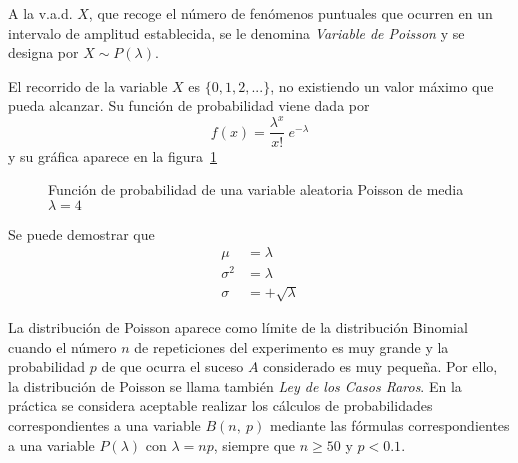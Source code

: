 A la v.a.d. $X$, que recoge el número de fenómenos puntuales que ocurren en un intervalo de amplitud establecida, se le
denomina \emph{Variable de Poisson} y se designa por $X\sim P(\lambda)$.

El recorrido de la variable $X$ es $\{0,1,2,...\}$, no existiendo un valor máximo que pueda alcanzar. Su función de
probabilidad viene dada por \[ f(x) = \frac{{\lambda ^x }}{{x!}}\  e^{ - \lambda } \] y su gráfica aparece en la
figura~\ref{g:poisson}

\begin{figure}[h!]
\centering
\scalebox{0.8}{} 
\caption{Función de probabilidad de una variable aleatoria Poisson de media $\lambda=4$}\label{g:poisson}
\end{figure}

Se puede demostrar que
\begin{align*}
\mu  &= \lambda\\
\sigma ^2  &= \lambda\\
\sigma  &=  + \sqrt {\lambda}
\end{align*}

La distribución de Poisson aparece como límite de la distribución Binomial cuando el número $n$ de repeticiones del
experimento es muy grande y la probabilidad $p$ de que ocurra el suceso $A$ considerado es muy pequeña.
Por ello, la distribución de Poisson se llama también \emph{Ley de los Casos Raros}.
En la práctica se considera aceptable realizar los cálculos de probabilidades correspondientes a una variable $B(n,\ p)$
mediante las fórmulas correspondientes a una variable $P(\lambda)$ con $\lambda=n p$, siempre que $n\geq 50$ y $p<0.1$.

\clearpage
\newpage

